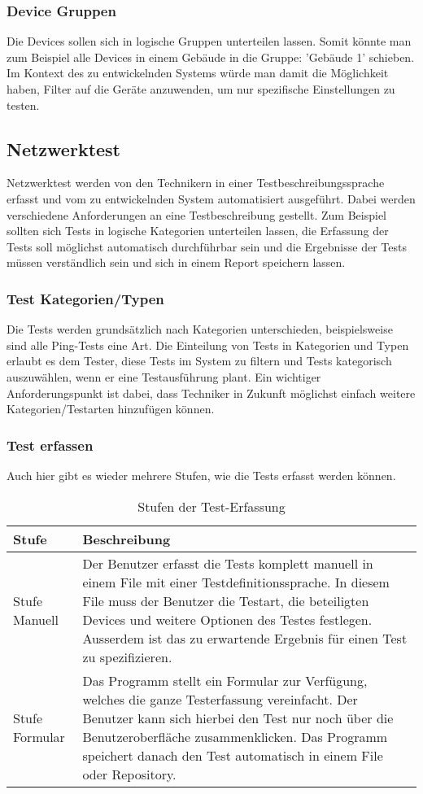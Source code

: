 \documentclass[
	ngerman,
	toc=listof, %
	toc=bibliography, %
	footnotes=multiple, %
	parskip=half, %
	numbers=noendperiod %
]{scrartcl}
\begin{document}
		\subsubsection{Device Gruppen}
			Die Devices sollen sich in logische Gruppen unterteilen lassen. Somit könnte man zum Beispiel alle Devices in einem Gebäude in die Gruppe: 'Gebäude 1' schieben.
			Im Kontext des zu entwickelnden Systems würde man damit die Möglichkeit haben, Filter auf die Geräte anzuwenden, um nur spezifische Einstellungen zu testen.

	\subsection{Netzwerktest}
		Netzwerktest werden von den Technikern in einer Testbeschreibungssprache erfasst und vom zu entwickelnden System automatisiert ausgeführt.
		Dabei werden verschiedene Anforderungen an eine Testbeschreibung gestellt. Zum Beispiel sollten sich Tests in logische Kategorien unterteilen lassen, die Erfassung der Tests soll möglichst automatisch durchführbar sein und die Ergebnisse der Tests müssen verständlich sein und sich in einem Report speichern lassen.

		
		\subsubsection{Test Kategorien/Typen}
			Die Tests werden grundsätzlich nach Kategorien unterschieden, beispielsweise sind alle Ping-Tests eine Art.
			Die Einteilung von Tests in Kategorien und Typen erlaubt es dem Tester, diese Tests im System zu filtern und Tests kategorisch auszuwählen, wenn er eine Testausführung plant.
			Ein wichtiger Anforderungspunkt ist dabei, dass Techniker in Zukunft möglichst einfach weitere Kategorien/Testarten hinzufügen können.

		\subsubsection{Test erfassen}
			Auch hier gibt es wieder mehrere Stufen, wie die Tests erfasst werden können.\\
			\begin{table}[!h]
				\begin{tabularx}{\textwidth}{lX}
					\toprule
					Stufe & Beschreibung\\
					\midrule
					Stufe Manuell & Der Benutzer erfasst die Tests komplett manuell in einem File mit einer Testdefinitionssprache. In diesem File muss der Benutzer die Testart, die beteiligten Devices und weitere Optionen des Testes festlegen. Ausserdem ist das zu erwartende Ergebnis für einen Test zu spezifizieren. \\
					\midrule
					Stufe Formular & Das Programm stellt ein Formular zur Verfügung, welches die ganze Testerfassung vereinfacht. Der Benutzer kann sich hierbei den Test nur noch über die Benutzeroberfläche zusammenklicken. Das Programm speichert danach den Test automatisch in einem File oder Repository. \\
					\bottomrule
				\end{tabularx}
				\caption{Stufen der Test-Erfassung}
			\end{table}
			
\end{document}
